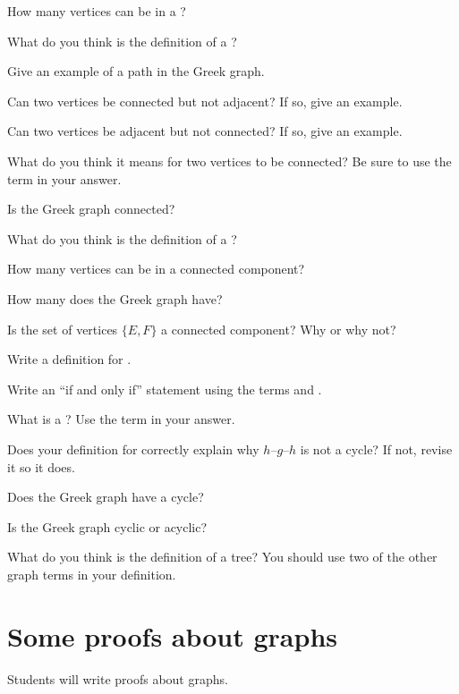 \documentclass{tufte-handout}
\begin{document}
\begin{questions}
\item How many vertices can be in a ?
\item What do you think is the definition of a ?
\item Give an example of a path in the Greek graph.
\item Can two vertices be connected but not adjacent?  If so, give an
  example.
\item Can two vertices be adjacent but not connected?  If so, give an
  example.
\item What do you think it means for two vertices to be connected?  Be
  sure to use the term  in your answer.
\item Is the Greek graph connected?
\item What do you think is the definition of a ?
\item How many vertices can be in a connected component?
\item How many  does the Greek graph have?
\item Is the set of vertices $\{E, F\}$ a connected component?  Why or
  why not?
\item Write a definition for .
\item Write an ``if and only if'' statement using the terms
   and .
\item What is a ?  Use the term  in your
  answer.
\item Does your definition for  correctly explain why
  $h$--$g$--$h$ is not a cycle?  If not, revise it so it does.
\item Does the Greek graph have a cycle?
\item Is the Greek graph cyclic or acyclic?
\item What do you think is the definition of a tree?  You should use
  two of the other graph terms in your
  definition.
\end{questions}

\pause

\section{Some proofs about graphs}

\begin{objective}
  Students will write proofs about graphs.
\end{objective}
\end{document}
